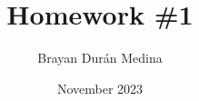 \documentclass{article}
\title{Homework \#1}
\author{Brayan Durán Medina}
\date{November 2023}
\begin{document}
\maketitle

\break


\end{document}
